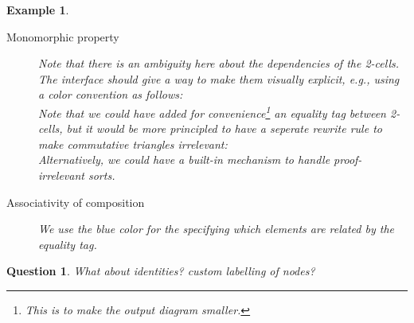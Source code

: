 \documentclass{article}
\newtheorem{example}{Example}[section]
\newtheorem{question}{Question}[section]
\begin{document}
\begin{example}
\begin{description}
\item[Monomorphic property]
\begin{equation}

\tag{Mono}
\label{eq:rew-mono-fo}
\end{equation}
Note that there is an ambiguity here about the dependencies of the 2-cells. The interface should give a way to make them visually explicit, e.g., using a color convention as follows:
\[

\]
Note that we could have added for convenience\footnote{This is to make the output diagram smaller.} an equality tag between 2-cells, 
but it would be more principled 
to have a seperate rewrite rule  to make commutative triangles irrelevant:
\[

\]
Alternatively, we could have a built-in mechanism to handle proof-irrelevant sorts.
\item[Associativity of composition]
We use the blue color for the specifying which elements 
are related by the equality tag.
\begin{equation}
    
    \label{eq:rew-assoc}
    \tag{Assoc}
    \end{equation}
% 
% 
\end{description}
\end{example}
\begin{question}
    What about identities? custom labelling of nodes?
\end{question}
\end{document}
